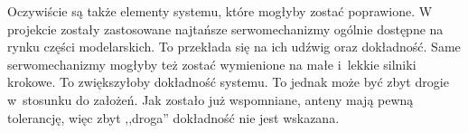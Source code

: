 \documentclass[eng,oneside]{mgr}
\begin{document}
	Oczywiście są także elementy systemu, które mogłyby zostać poprawione. W projekcie zostały zastosowane najtańsze serwomechanizmy ogólnie dostępne na rynku części modelarskich. To przekłada się na ich udźwig oraz dokładność. Same serwomechanizmy mogłyby też zostać wymienione na małe i~lekkie silniki krokowe. To zwiększyłoby dokładność systemu. To jednak może być zbyt drogie w~stosunku do założeń. Jak zostało już wspomniane, anteny mają pewną tolerancję, więc zbyt ,,droga'' dokładność nie jest wskazana.

	\nocite{*}
	
	
	\listoffigures
\end{document}
